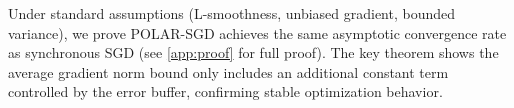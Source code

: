 




Under standard assumptions (L-smoothness, unbiased gradient, bounded variance), we prove POLAR-SGD achieves the same asymptotic convergence rate as synchronous SGD (see \ref{app:proof} for full proof). The key theorem shows the average gradient norm bound only includes an additional constant term controlled by the error buffer, confirming stable optimization behavior.